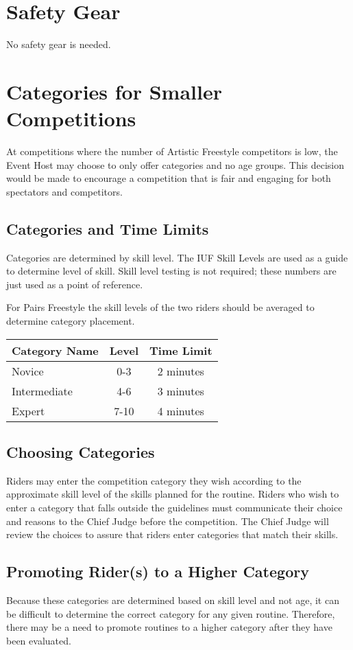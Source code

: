 \section{Safety Gear}
No safety gear is needed.

\section{Categories for Smaller Competitions}
At competitions where the number of Artistic Freestyle competitors is low, the Event Host may choose to only offer categories and no age groups.
This decision would be made to encourage a competition that is fair and engaging for both spectators and competitors.

\subsection{Categories and Time Limits}
Categories are determined by skill level.
The IUF Skill Levels are used as a guide to determine level of skill.
Skill level testing is not required; these numbers are just used as a point of reference.

For Pairs Freestyle the skill levels of the two riders should be averaged to determine category placement.

\begin{tabular}{|l|c|c|}
\hline
\textbf{Category Name} & \textbf{Level} & \textbf{Time Limit} \\
\hline
Novice & 0-3 & 2 minutes \\
\hline
Intermediate & 4-6 & 3 minutes \\
\hline
Expert & 7-10 & 4 minutes \\
\hline
\end{tabular}

\subsection{Choosing Categories}
Riders may enter the competition category they wish according to the approximate skill
level of the skills planned for the routine.
Riders who wish to enter a category that falls outside the guidelines must communicate their choice and reasons to the Chief Judge before the competition.
The Chief Judge will review the choices to assure that riders enter categories that match their skills.

\subsection{Promoting Rider(s) to a Higher Category}
Because these categories are determined based on skill level and not age, it can be difficult to determine the correct category for any given routine.
Therefore, there may be a need to promote routines to a higher category after they have been evaluated.

